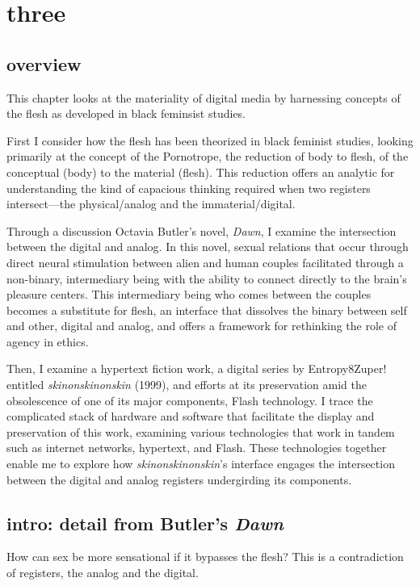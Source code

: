 \documentclass[11pt]{article}
\author{Filipa  Calado}
\date{\today}
\title{}
\begin{document}
\tableofcontents

\section{three}
\label{sec:org7ecfdc3}

\subsection{overview}
\label{sec:org803e1c5}

This chapter looks at the materiality of digital media by harnessing
concepts of the flesh as developed in black feminsist studies. 

First I consider how the flesh has been theorized in black feminist
studies, looking primarily at the concept of the Pornotrope, the
reduction of body to flesh, of the conceptual (body) to the material
(flesh). This reduction offers an analytic for understanding the kind
of capacious thinking required when two registers intersect---the
physical/analog and the immaterial/digital.

Through a discussion Octavia Butler's novel, \emph{Dawn}, I examine the
intersection between the digital and analog. In this novel, sexual
relations that occur through direct neural stimulation between alien
and human couples facilitated through a non-binary, intermediary being
with the ability to connect directly to the brain's pleasure centers.
This intermediary being who comes between the couples becomes a
substitute for flesh, an interface that dissolves the binary between
self and other, digital and analog, and offers a framework for
rethinking the role of agency in ethics.

Then, I examine a hypertext fiction work, a digital series by
Entropy8Zuper! entitled \emph{skinonskinonskin} (1999), and efforts at its
preservation amid the obsolescence of one of its major components,
Flash technology. I trace the complicated stack of hardware and
software that facilitate the display and preservation of this work,
examining various technologies that work in tandem such as internet
networks, hypertext, and Flash. These technologies together enable me
to explore how \emph{skinonskinonskin}'s interface engages the intersection
between the digital and analog registers undergirding its components. 


\subsection{intro: detail from Butler's \emph{Dawn}}
\label{sec:orgabd5ed5}
How can sex be more sensational if it bypasses the flesh? This is a
contradiction of registers, the analog and the digital. 
\end{document}
